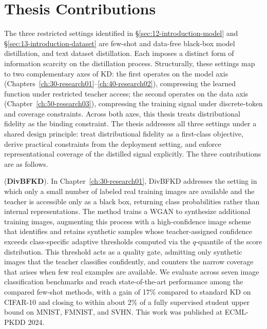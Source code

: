\section{Thesis Contributions} \label{sec:15-introduction-contributions}
\begin{foldable}
  The three restricted settings identified in \S\ref{sec:12-introduction-model} and \S\ref{sec:13-introduction-dataset} are few-shot and data-free black-box model distillation, and text dataset distillation.
  Each imposes a distinct form of information scarcity on the distillation process.
  Structurally, these settings map to two complementary axes of \ac{KD}: the first operates on the model axis (Chapters~\ref{ch:30-research01}--\ref{ch:40-research02}), compressing the learned function under restricted teacher access; the second operates on the data axis (Chapter~\ref{ch:50-research03}), compressing the training signal under discrete-token and coverage constraints.
  Across both axes, this thesis treats distributional fidelity as the binding constraint.
  The thesis addresses all three settings under a shared design principle: treat distributional fidelity as a first-class objective, derive practical constraints from the deployment setting, and enforce representational coverage of the distilled signal explicitly.
  The three contributions are as follows.
\end{foldable}

\begin{foldable}
   (\textbf{\acs{DivBFKD}}).
  In Chapter~\ref{ch:30-research01}, \ac{DivBFKD} addresses the setting in which only a small number of labeled real training images are available and the teacher is accessible only as a black box, returning class probabilities rather than internal representations.
  The method trains a \ac{WGAN} to synthesize additional training images, augmenting this process with a high-confidence image scheme that identifies and retains synthetic samples whose teacher-assigned confidence exceeds class-specific adaptive thresholds computed via the $q$-quantile of the score distribution.
  This threshold acts as a quality gate, admitting only synthetic images that the teacher classifies confidently, and counters the narrow coverage that arises when few real examples are available.
  We evaluate across seven image classification benchmarks and reach state-of-the-art performance among the compared few-shot methods, with a gain of 17\% compared to standard \ac{KD} on CIFAR-10 and closing to within about 2\% of a fully supervised student upper bound on MNIST, FMNIST, and SVHN.
  This work was published at ECML-PKDD 2024.
\end{foldable}

